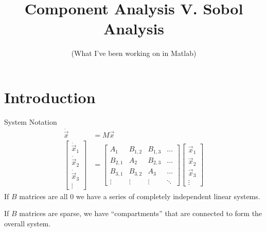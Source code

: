 \documentclass{beamer}
\title{Component Analysis V. Sobol Analysis}
\subtitle{(What I've been working on in Matlab)}
\date{}
\begin{document}

\begin{frame}
\titlepage
\end{frame}
\addtocounter{framenumber}{-1}

\section{Introduction}
\begin{frame}{System Notation}
\begin{align}
\dot{\vec{x}}&=M\vec{x} \\
\begin{bmatrix}
	\dot{\vec{x}}_1 \\
	\dot{\vec{x}}_2 \\
	\dot{\vec{x}}_3 \\
	\vdots
\end{bmatrix} &= 
\begin{bmatrix}
	A_1 & B_{1,2} & B_{1,3} & \ldots\\
	B_{2,1} & A_2 & B_{2,3} & \ldots\\
	B_{3,1} & B_{3,2} & A_3 & \ldots\\
	\vdots & \vdots & \vdots &\ddots
\end{bmatrix}
\begin{bmatrix}
	\vec{x}_1 \\
	\vec{x}_2 \\
	\vec{x}_3 \\
	\vdots
\end{bmatrix}
\end{align}
If $B$ matrices are all 0 we have a series of completely independent linear systems.

If $B$ matrices are sparse, we have ``compartments'' that are connected to form the overall system.
\end{frame}
\end{document}
